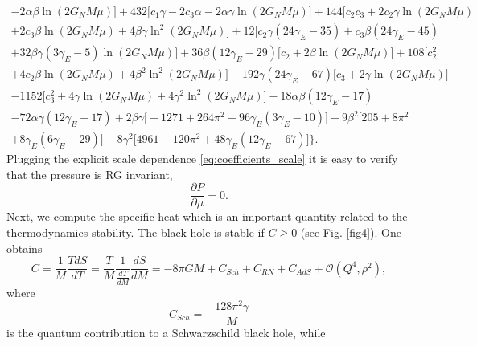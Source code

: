 \documentclass[10pt,a4paper]{article}
\begin{document}
\begin{multline}
    -2\alpha\beta\ln(2G_NM\mu)\Big]+432\Big[c_1\gamma-2c_3\alpha-2\alpha\gamma\ln(2G_NM\mu)\Big]+144\Big[c_2c_3+2c_2\gamma\ln(2G_NM\mu)\\
    +2c_3\beta\ln(2G_NM\mu)+4\beta\gamma\ln^2(2G_NM\mu)\Big]+12\Big[c_2\gamma(24\gamma_E-35)+c_3\beta(24\gamma_E-45)\\
    +32\beta\gamma(3\gamma_E-5)\ln(2G_NM\mu)\Big]+36\beta(12\gamma_E-29)\Big[c_2+2\beta\ln(2G_NM\mu)\Big]+108\Big[c_2^2\\
    +4c_2\beta\ln(2G_NM\mu)+4\beta^2\ln^2(2G_NM\mu)\Big]-192\gamma(24\gamma_E-67)\Big[c_3+2\gamma\ln(2G_NM\mu)\Big]\\
    -1152\Big[c^2_3+4\gamma\ln(2G_NM\mu)+4\gamma^2\ln^2(2G_NM\mu)\Big]-18\alpha\beta(12\gamma_E-17)\\-72\alpha\gamma(12\gamma_E-17)
    +2\beta\gamma\Big[-1271+264\pi^2+96\gamma_E(3\gamma_E-10)\Big]+9\beta^2\Big[205+8\pi^2\\+8\gamma_E(6\gamma_E-29)\Big]
    -8\gamma^2\Big[4961-120\pi^2+48\gamma_E(12\gamma_E-67)\Big]\bigg\}.
\end{multline}
Plugging the explicit scale dependence \eqref{eq:coefficients_scale} it is easy to verify that the pressure is RG invariant,
\begin{equation}
    \frac{\partial P}{\partial \mu}=0.
\end{equation}
Next, we compute the specific heat which is an important quantity related to the thermodynamics stability. The black hole is stable if $C\geq0$ (see Fig. \ref{fig4}). One obtains
\begin{equation}
    C=\frac{1}{M}\frac{TdS}{dT}=\frac{T}{M}\frac{1}{\frac{dT}{dM}}\frac{dS}{dM}=-8\pi GM+C_{Sch}+C_{RN}+C_{AdS}+\mathcal{O}\left(Q^4,\rho^2\right),
\end{equation}
where
\begin{equation}
   C_{Sch}=-\frac{128\pi^2\gamma}{M}
\end{equation}
is the quantum contribution to a Schwarzschild black hole, while
\end{document}
